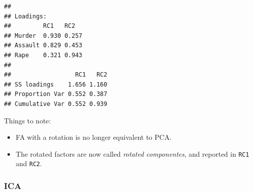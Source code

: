 \documentclass[]{book}
\newenvironment{Shaded}{\begin{snugshade}}{\end{snugshade}}
\newcommand{\KeywordTok}[1]{\textcolor[rgb]{0.13,0.29,0.53}{\textbf{#1}}}
\newcommand{\DataTypeTok}[1]{\textcolor[rgb]{0.13,0.29,0.53}{#1}}
\newcommand{\DecValTok}[1]{\textcolor[rgb]{0.00,0.00,0.81}{#1}}
\newcommand{\StringTok}[1]{\textcolor[rgb]{0.31,0.60,0.02}{#1}}
\newcommand{\OperatorTok}[1]{\textcolor[rgb]{0.81,0.36,0.00}{\textbf{#1}}}
\newcommand{\NormalTok}[1]{#1}
\providecommand{\tightlist}{%
  \setlength{\itemsep}{0pt}\setlength{\parskip}{0pt}}
\theoremstyle{definition}
\theoremstyle{definition}
\theoremstyle{definition}
\theoremstyle{remark}
\begin{document}
\begin{Shaded}
\end{Shaded}

\begin{verbatim}
## 
## Loadings:
##         RC1   RC2  
## Murder  0.930 0.257
## Assault 0.829 0.453
## Rape    0.321 0.943
## 
##                  RC1   RC2
## SS loadings    1.656 1.160
## Proportion Var 0.552 0.387
## Cumulative Var 0.552 0.939
\end{verbatim}

Things to note:

\begin{itemize}
\tightlist
\item
  FA with a rotation is no longer equivalent to PCA.
\item
  The rotated factors are now called \emph{rotated componentes}, and
  reported in \texttt{RC1} and \texttt{RC2}.
\end{itemize}

\subsubsection{ICA}\label{ica}
\end{document}
